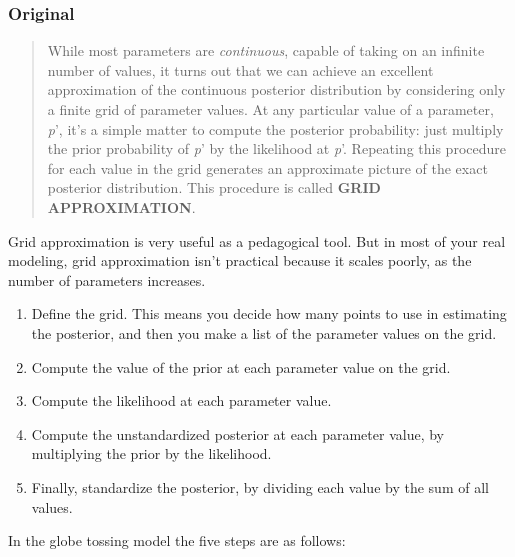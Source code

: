 \documentclass[
  letterpaper,
  DIV=11,
  numbers=noendperiod]{scrreprt}
\providecommand{\tightlist}{%
  \setlength{\itemsep}{0pt}\setlength{\parskip}{0pt}}\usepackage{longtable,booktabs,array}
\begin{document}
\hypertarget{original-6}{%
\subsubsection{Original}\label{original-6}}

\begin{quote}
While most parameters are \emph{continuous}, capable of taking on an
infinite number of values, it turns out that we can achieve an excellent
approximation of the continuous posterior distribution by considering
only a finite grid of parameter values. At any particular value of a
parameter, \emph{p}', it's a simple matter to compute the posterior
probability: just multiply the prior probability of \emph{p}' by the
likelihood at \emph{p}'. Repeating this procedure for each value in the
grid generates an approximate picture of the exact posterior
distribution. This procedure is called \textbf{GRID APPROXIMATION}.
\end{quote}

Grid approximation is very useful as a pedagogical tool. But in most of
your real modeling, grid approximation isn't practical because it scales
poorly, as the number of parameters increases.

\begin{enumerate}
\def\labelenumi{\arabic{enumi}.}
\tightlist
\item
  Define the grid. This means you decide how many points to use in
  estimating the posterior, and then you make a list of the parameter
  values on the grid.
\item
  Compute the value of the prior at each parameter value on the grid.
\item
  Compute the likelihood at each parameter value.
\item
  Compute the unstandardized posterior at each parameter value, by
  multiplying the prior by the likelihood.
\item
  Finally, standardize the posterior, by dividing each value by the sum
  of all values.
\end{enumerate}

In the globe tossing model the five steps are as follows:
\end{document}
